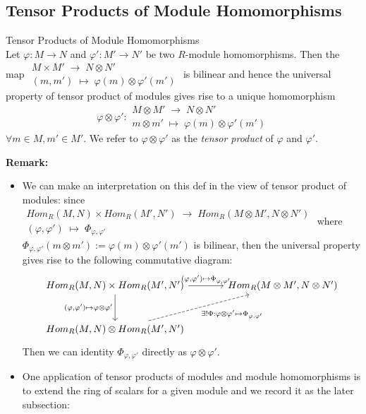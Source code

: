 \subsection{Tensor Products of Module Homomorphisms}

\begin{definition}{Tensor Products of Module Homomorphisms}\\
Let $\varphi: M\to N$ and $\varphi' :M'\to N'$ be two $R$-module homomorphisms. Then the map $\substack{M \times M' \;\to\; N\otimes N'\\
(m,m') \;\mapsto\; \varphi(m) \otimes \varphi'(m')}$ is bilinear and hence the universal property of tensor product of modules gives rise to a unique homomorphism
$$\varphi \otimes \varphi': \substack{M \otimes M' \;\to\; N\otimes N'\\
m\otimes m' \;\mapsto\; \varphi(m) \otimes \varphi'(m')}$$
$\forall m\in M,m'\in M'$. We refer to $\varphi \otimes \varphi'$ as the \textit{tensor product} of $\varphi$ and $\varphi'$.
\end{definition}

\noindent\textbf{Remark:} \begin{itemize}
    \item We can make an interpretation on this def in the view of tensor product of modules: since $\substack{Hom_R(M,N) \times Hom_R(M',N') \;\to\; Hom_R(M \otimes M',N \otimes N')\\
    (\varphi,\varphi') \;\mapsto\; \Phi_{\varphi,\varphi'}}$ where $\Phi_{\varphi,\varphi'} (m \otimes m') := \varphi(m) \otimes \varphi'(m')$ is bilinear, then the universal property gives rise to the following commutative diagram:
    \[
    \begin{tikzcd}[row sep=large, column sep=large]
    Hom_R(M,N) \times Hom_R(M',N') \arrow[r, "{(\varphi,\varphi')} \mapsto \Phi_{\varphi,\varphi'}"] \arrow[d, "{(\varphi,\varphi')} \mapsto {\varphi \otimes \varphi'}"'] & Hom_R(M \otimes M',N \otimes N') \\
    Hom_R(M,N) \otimes Hom_R(M',N') \arrow[ur, dashed, "\exists! \Phi: \varphi \otimes \varphi' \mapsto \Phi_{\varphi, \varphi'}"'] & 
    \end{tikzcd}
    \]
    Then we can identity $\Phi_{\varphi, \varphi'}$ directly as $\varphi \otimes \varphi'$.

    \item One application of tensor products of modules and module homomorphisms is to extend the ring of scalars for a given module and we record it as the later subsection:
\end{itemize}

